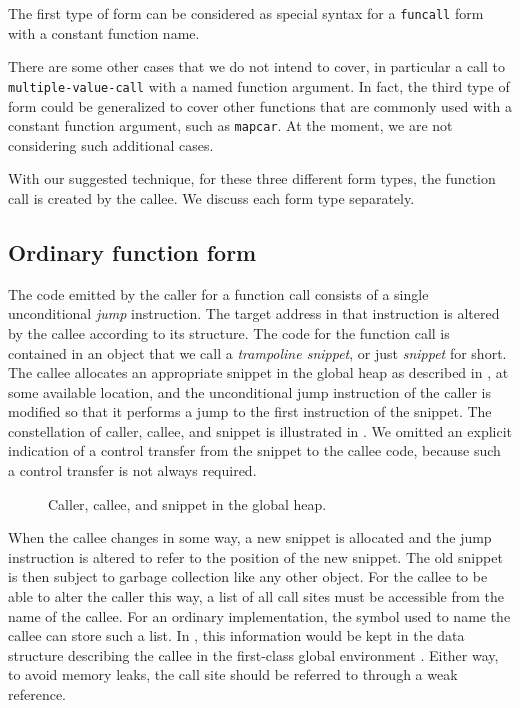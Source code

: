 \noindent
The first type of form can be considered as special syntax for a
\texttt{funcall} form with a constant function name.

There are some other cases that we do not intend to cover, in
particular a call to \texttt{multiple-value-call} with a named
function argument.  In fact, the third type of form could be
generalized to cover other functions that are commonly used with
a constant function argument, such as \texttt{mapcar}.  At the moment,
we are not considering such additional cases.

With our suggested technique, for these three different form types,
the function call is created by the callee.  We discuss each form type
separately.

\subsection{Ordinary function form}

The code emitted by the caller for a function call consists of a
single unconditional \emph{jump} instruction.  The target address in
that instruction is altered by the callee according to its structure.
The code for the function call is contained in an object that we call
a \emph{trampoline snippet}, or just \emph{snippet} for short.  The
callee allocates an appropriate snippet in the global heap as
described in , at some available location,
and the unconditional jump instruction of the caller is modified so
that it performs a jump to the first instruction of the snippet.  The
constellation of caller, callee, and snippet is illustrated in
.  We omitted an explicit indication of a control
transfer from the snippet to the callee code, because such a control
transfer is not always required.

\begin{figure}
\begin{center}
\end{center}
\caption{\label{fig-snippet}
Caller, callee, and snippet in the global heap.}
\end{figure}

When the callee changes in some way, a new snippet is allocated and
the jump instruction is altered to refer to the position of the new
snippet.  The old snippet is then subject to garbage collection like
any other object.  For the callee to be able to alter the caller this
way, a list of all call sites must be accessible from the name of the
callee.  For an ordinary \commonlisp{} implementation, the symbol used
to name the callee can store such a list.  In \sicl{}, this
information would be kept in the data structure describing the callee
in the first-class global environment
\cite{Strandh:2015:ELS:Environments}.  Either way, to avoid memory
leaks, the call site should be referred to through a weak reference.

